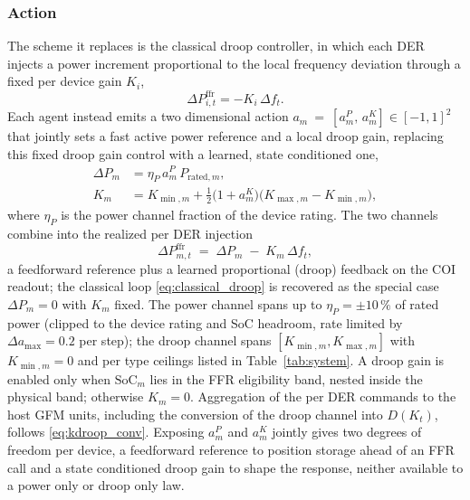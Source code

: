 \documentclass[lettersize,journal]{IEEEtran}
\begin{document}
	\subsubsection{Action}
	The scheme it replaces is the classical droop controller, in which each DER injects a power increment proportional to the local frequency deviation through a fixed per device gain $K_i$,
	\begin{equation}
		\Delta P^{\mathrm{ffr}}_{i,t}=-K_i\,\Delta f_t.
		\label{eq:classical_droop}
	\end{equation}
	Each agent instead emits a two dimensional action $a_m~=~[a^P_m,\,a^K_m]\in[-1,1]^2$ that jointly sets a fast active power reference and a local droop gain, replacing this fixed droop gain control with a learned, state conditioned one,
	\begin{align}
		\Delta P_m
		&= \eta_P\,a^P_m\,P_{\mathrm{rated},m},
		\label{eq:action_power}\\
		K_m
		&= K_{\min,m}
		+\tfrac{1}{2}\bigl(1+a^K_m\bigr)
		\bigl(K_{\max,m}-K_{\min,m}\bigr),
		\label{eq:action_droop}
	\end{align}
	where $\eta_P$ is the power channel fraction of the device rating. The two channels combine into the realized per DER injection
	\begin{equation}
		\Delta P^{\mathrm{ffr}}_{m,t} \;=\; \Delta P_m \;-\; K_m\,\Delta f_t,
		\label{eq:dual_law}
	\end{equation}
	a feedforward reference plus a learned proportional (droop) feedback on the COI readout; the classical loop \eqref{eq:classical_droop} is recovered as the special case $\Delta P_m=0$ with $K_m$ fixed. The power channel spans up to $\eta_P=\pm10\,\%$ of rated power (clipped to the device rating and SoC headroom, rate limited by $\Delta a_{\max}=0.2$ per step); the droop channel spans $[K_{\min,m},K_{\max,m}]$ with $K_{\min,m}=0$ and per type ceilings listed in Table~\ref{tab:system}. A droop gain is enabled only when $\mathrm{SoC}_m$ lies in the FFR eligibility band, nested inside the physical band; otherwise $K_m=0$. Aggregation of the per DER commands to the host GFM units, including the conversion of the droop channel into $D(K_t)$, follows \eqref{eq:kdroop_conv}. Exposing $a^P_m$ and $a^K_m$ jointly gives two degrees of freedom per device, a feedforward reference to position storage ahead of an FFR call and a state conditioned droop gain to shape the response, neither available to a power only or droop only law.
\end{document}
